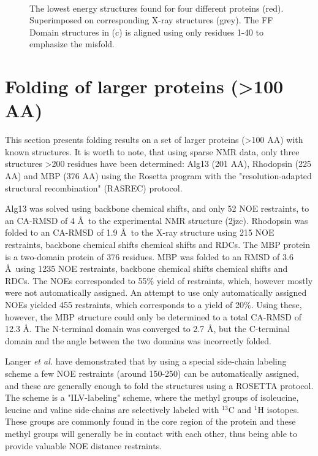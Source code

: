 \begin{figure}
{    }\\
    \caption{The lowest energy structures found for four different proteins (red). Superimposed on corresponding X-ray structures (grey). The FF Domain structures in (c) is aligned using only residues 1-40 to emphasize the misfold.}
    \label{fig:small_pics}%
\end{figure}



\clearpage

\section{Folding of larger proteins (\textgreater 100 AA)}

This section presents folding results on a set of larger proteins (\textgreater 100 AA) with known structures.
It is worth to note, that using sparse NMR data, only three structures \textgreater 200 residues have been determined: Alg13 (201 AA), Rhodopsin (225 AA) and MBP (376 AA) using the Rosetta program with the "resolution-adapted structural recombination" (RASREC) protocol.

Alg13 was solved using backbone chemical shifts, and only 52 NOE restraints, to an CA-RMSD of 4 \AA~to the experimental NMR structure (2jzc).
Rhodopsin was folded to an CA-RMSD of 1.9 \AA~to the X-ray structure using 215 NOE restraints, backbone chemical shifts chemical shifts and RDCs.
The MBP protein is a two-domain protein of 376 residues.
MBP was folded to an RMSD of 3.6 \AA~using 1235 NOE restraints, backbone chemical shifts chemical shifts and RDCs.
The NOEs corresponded to 55\% yield of restraints, which, however mostly were not automatically assigned.
An attempt to use only automatically assigned NOEs yielded 455 restraints, which corresponds to a yield of 20\%. Using these, however, the MBP structure could only be determined to a total CA-RMSD of 12.3 \AA.
The N-terminal domain was converged to 2.7 \AA, but the C-terminal domain and the angle between the two domains was incorrectly folded.

Langer \textit{et al.} have demonstrated that by using a special side-chain labeling scheme a few NOE restraints (around 150-250) can be automatically assigned, and these are generally enough to fold the structures using a ROSETTA protocol.
The scheme is a "ILV-labeling" scheme, where the methyl groups of isoleucine, leucine and valine side-chains are selectively labeled with $^{13}$C and $^1$H isotopes. These groups are commonly found in the core region of the protein and these methyl groups will generally be in contact with each other, thus being able to provide valuable NOE distance restraints.

